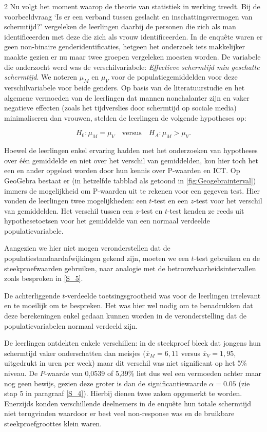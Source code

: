 \begin{multicols}{2}
    Nu volgt het moment waarop de theorie van statistiek in werking treedt. Bij de voorbeeldvraag `Is er een verband tussen geslacht en inschattingsvermogen van schermtijd?' vergeleken de leerlingen daarbij de personen die zich als man identificeerden met deze die zich als vrouw identificeerden. In de enqu\^ete waren er geen non-binaire genderidentificaties, hetgeen het onderzoek iets makkelijker maakte gezien er nu maar twee groepen vergeleken moesten worden. De variabele die onderzocht werd was de verschilvariabele: \emph{Effectieve schermtijd min geschatte schermtijd}. We noteren $\mu_M$ en $\mu_V$ voor de populatiegemiddelden voor deze verschilvariabele voor beide genders. Op basis van de literatuurstudie en het algemene vermoeden van de leerlingen dat mannen nonchalanter zijn en vaker negatieve effecten (zoals het tijdverslies door schermtijd op sociale media) minimaliseren dan vrouwen, stelden de leerlingen de volgende hypotheses op:
    
\[
H_0: \mu_M = \mu_V \quad \text{versus} \quad H_A: \mu_M > \mu_V. 
\]

    Hoewel de leerlingen enkel ervaring hadden met het onderzoeken van hypotheses over \'e\'en gemiddelde en niet over het verschil van gemiddelden, kon hier toch het een en ander opgelost worden door hun kennis over P-waarden en ICT. Op GeoGebra bestaat er (in hetzelfde tabblad als getoond in \autoref{fig:Geogebrainterval}) immers de mogelijkheid om P-waarden uit te rekenen voor een gegeven test. Hier vonden de leerlingen twee mogelijkheden: een $t$-test en een $z$-test voor het verschil van gemiddelden. Het verschil tussen een $z$-test en $t$-test kenden ze reeds uit hypothesetoetsen voor het gemiddelde van een normaal verdeelde populatievariabele.
    
    Aangezien we hier niet mogen veronderstellen dat de populatiestandaardafwijkingen gekend zijn, moeten we een $t$-test gebruiken en de steekproefwaarden gebruiken, naar analogie met de betrouwbaarheidsintervallen zoals besproken in \autoref{S_5}. 
        
    De achterliggende $t$-verdeelde toetsingsgrootheid was voor de leerlingen irrelevant en te moeilijk om te bespreken. Het was hier wel nodig om te benadrukken dat deze berekeningen enkel gedaan kunnen worden in de veronderstelling dat de populatievariabelen normaal verdeeld zijn.

    De leerlingen ontdekten enkele verschillen: in de steekproef bleek dat jongens hun schermtijd vaker onderschatten dan meisjes ($\overline{x}_M=6,11$ versus $\overline{x}_V=1,95$, uitgedrukt in uren per week) maar dit verschil was niet significant op het 5\% niveau. De $P$-waarde van 0,0539 of 5,39\% liet dus wel een vermoeden achter maar nog geen bewijs, gezien deze groter is dan de significantiewaarde $\alpha=0.05$ (zie stap 5 in paragraaf \ref{S_4}). Hierbij dienen twee zaken opgemerkt te worden. Enerzijds konden verschillende deelnemers in de enqu\^ete hun totale schermtijd niet terugvinden waardoor er best veel non-response was en de bruikbare steekproefgroottes klein waren. 


\end{multicols}
